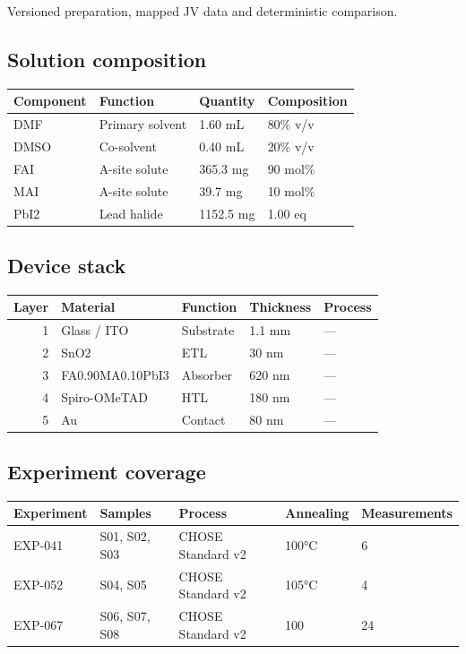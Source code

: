 \documentclass[10pt,a4paper]{article}
\begin{document}
Versioned preparation, mapped JV data and deterministic comparison.

\subsection{Solution composition}
\begin{tabularx}{\linewidth}{@{}lXXX@{}}\toprule Component & Function & Quantity & Composition \\ \midrule
DMF & Primary solvent & 1.60 mL & 80\% v/v \\
DMSO & Co-solvent & 0.40 mL & 20\% v/v \\
FAI & A-site solute & 365.3 mg & 90 mol\% \\
MAI & A-site solute & 39.7 mg & 10 mol\% \\
PbI2 & Lead halide & 1152.5 mg & 1.00 eq \\
\bottomrule\end{tabularx}

\subsection{Device stack}
\begin{tabularx}{\linewidth}{@{}rXXXX@{}}\toprule Layer & Material & Function & Thickness & Process \\ \midrule
1 & Glass / ITO & Substrate & 1.1 mm & — \\
2 & SnO2 & ETL & 30 nm & — \\
3 & FA0.90MA0.10PbI3 & Absorber & 620 nm & — \\
4 & Spiro-OMeTAD & HTL & 180 nm & — \\
5 & Au & Contact & 80 nm & — \\
\bottomrule\end{tabularx}
\subsection{Experiment coverage}
\begin{tabularx}{\linewidth}{@{}lXXXX@{}}\toprule Experiment & Samples & Process & Annealing & Measurements \\ \midrule
EXP-041 & S01, S02, S03 & CHOSE Standard v2 & 100°C & 6 \\
EXP-052 & S04, S05 & CHOSE Standard v2 & 105°C & 4 \\
EXP-067 & S06, S07, S08 & CHOSE Standard v2 & 100 & 24 \\
\bottomrule\end{tabularx}
\end{document}
